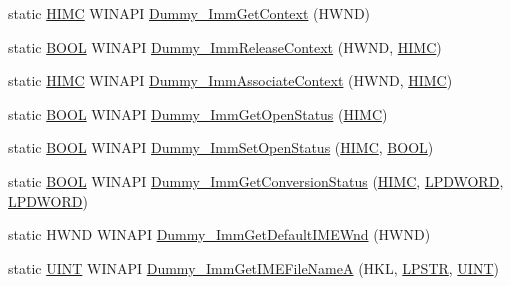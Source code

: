 \begin{DoxyCompactItemize}
\item 
static \hyperlink{class_c_d_x_u_t_i_m_e_edit_box_aa9afdec726ecd526e2a0abc01537426c}{HIMC} WINAPI \hyperlink{class_c_d_x_u_t_i_m_e_edit_box_adc9a00e652fc7ddeb39674bb38998848}{Dummy\_\-ImmGetContext} (HWND)
\item 
static \hyperlink{class_c_d_x_u_t_i_m_e_edit_box_ad2239c74ad7d59cbb8e6d2b5bf17bcb8}{BOOL} WINAPI \hyperlink{class_c_d_x_u_t_i_m_e_edit_box_a9b878886ec372fd37be7ec1d9fcf448f}{Dummy\_\-ImmReleaseContext} (HWND, \hyperlink{class_c_d_x_u_t_i_m_e_edit_box_aa9afdec726ecd526e2a0abc01537426c}{HIMC})
\item 
static \hyperlink{class_c_d_x_u_t_i_m_e_edit_box_aa9afdec726ecd526e2a0abc01537426c}{HIMC} WINAPI \hyperlink{class_c_d_x_u_t_i_m_e_edit_box_a30b830faa43dc64e1d1131aa57c36bce}{Dummy\_\-ImmAssociateContext} (HWND, \hyperlink{class_c_d_x_u_t_i_m_e_edit_box_aa9afdec726ecd526e2a0abc01537426c}{HIMC})
\item 
static \hyperlink{class_c_d_x_u_t_i_m_e_edit_box_ad2239c74ad7d59cbb8e6d2b5bf17bcb8}{BOOL} WINAPI \hyperlink{class_c_d_x_u_t_i_m_e_edit_box_aa765987d0faac289568999c30cfa318f}{Dummy\_\-ImmGetOpenStatus} (\hyperlink{class_c_d_x_u_t_i_m_e_edit_box_aa9afdec726ecd526e2a0abc01537426c}{HIMC})
\item 
static \hyperlink{class_c_d_x_u_t_i_m_e_edit_box_ad2239c74ad7d59cbb8e6d2b5bf17bcb8}{BOOL} WINAPI \hyperlink{class_c_d_x_u_t_i_m_e_edit_box_acf3e0acb26812bcf8285d81e3bd268c5}{Dummy\_\-ImmSetOpenStatus} (\hyperlink{class_c_d_x_u_t_i_m_e_edit_box_aa9afdec726ecd526e2a0abc01537426c}{HIMC}, \hyperlink{class_c_d_x_u_t_i_m_e_edit_box_ad2239c74ad7d59cbb8e6d2b5bf17bcb8}{BOOL})
\item 
static \hyperlink{class_c_d_x_u_t_i_m_e_edit_box_ad2239c74ad7d59cbb8e6d2b5bf17bcb8}{BOOL} WINAPI \hyperlink{class_c_d_x_u_t_i_m_e_edit_box_a1c601fc105fded94dddc03d5201886bd}{Dummy\_\-ImmGetConversionStatus} (\hyperlink{class_c_d_x_u_t_i_m_e_edit_box_aa9afdec726ecd526e2a0abc01537426c}{HIMC}, \hyperlink{class_c_d_x_u_t_i_m_e_edit_box_a13c133202b7126d255528d5573500007}{LPDWORD}, \hyperlink{class_c_d_x_u_t_i_m_e_edit_box_a13c133202b7126d255528d5573500007}{LPDWORD})
\item 
static HWND WINAPI \hyperlink{class_c_d_x_u_t_i_m_e_edit_box_a9fed648c769d710f28388f9f8113db28}{Dummy\_\-ImmGetDefaultIMEWnd} (HWND)
\item 
static \hyperlink{class_c_d_x_u_t_i_m_e_edit_box_a7c83b549328a07897bdac88bb0ac4d68}{UINT} WINAPI \hyperlink{class_c_d_x_u_t_i_m_e_edit_box_a2741f033ba2d986072d42e06cfe6964e}{Dummy\_\-ImmGetIMEFileNameA} (HKL, \hyperlink{class_c_d_x_u_t_i_m_e_edit_box_ab59f6a19cb5a1ca421bcb075676ec5f1}{LPSTR}, \hyperlink{class_c_d_x_u_t_i_m_e_edit_box_a7c83b549328a07897bdac88bb0ac4d68}{UINT})

\end{DoxyCompactItemize}
